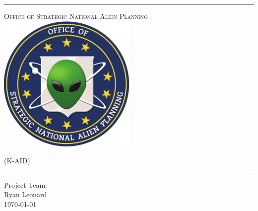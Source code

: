 \begin{titlepage}
\begin{center}

\rule{\linewidth}{0.5mm}

\textsc{\large Office of Strategic National Alien Planning}
~\\[1cm]
\includegraphics[width=0.5\textwidth]{./osnap_logo.pdf}~\\[1cm]


{\Huge \linespread{2}}

\vspace{10pt}

\textsc{\Large (K-AID)}

\rule{\linewidth}{0.5mm}

\vfill

Project Team:\\
Ryan Leonard\\

\vfill
{\large \today}

\end{center}
\end{titlepage}
